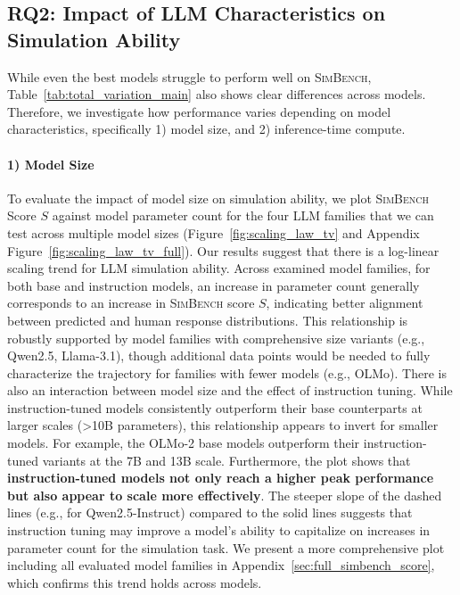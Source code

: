 \documentclass{article} %
\begin{document}
\subsection{RQ2: Impact of LLM Characteristics on Simulation Ability}
\label{sec:llm_characteristics}

While even the best models struggle to perform well on \textsc{SimBench}, Table~\ref{tab:total_variation_main} also shows clear differences across models.
Therefore, we investigate how performance varies depending on model characteristics, specifically 1) model size, and 2) inference-time compute.
\paragraph{1) Model Size}
To evaluate the impact of model size on simulation ability, we plot \textsc{SimBench} Score $S$ against model parameter count for the four LLM families that we can test across multiple model sizes (Figure~\ref{fig:scaling_law_tv} and Appendix Figure~\ref{fig:scaling_law_tv_full}).
Our results suggest that there is a log-linear scaling trend for LLM simulation ability. Across examined model families, for both base and instruction models, an increase in parameter count generally corresponds to an increase in \textsc{SimBench} score $S$, indicating better alignment between predicted and human response distributions. This relationship is robustly supported by model families with comprehensive size variants (e.g., Qwen2.5, Llama-3.1), though additional data points would be needed to fully characterize the trajectory for families with fewer models (e.g., OLMo).
There is also an interaction between model size and the effect of instruction tuning. While instruction-tuned models consistently outperform their base counterparts at larger scales (>10B parameters), this relationship appears to invert for smaller models. For example, the OLMo-2 base models outperform their instruction-tuned variants at the 7B and 13B scale. Furthermore, the plot shows that \textbf{instruction-tuned models not only reach a higher peak performance but also appear to scale more effectively}. The steeper slope of the dashed lines (e.g., for Qwen2.5-Instruct) compared to the solid lines suggests that instruction tuning may improve a model's ability to capitalize on increases in parameter count for the simulation task. We present a more comprehensive plot including all evaluated model families in Appendix~\ref{sec:full_simbench_score}, which confirms this trend holds across models.
\end{document}
